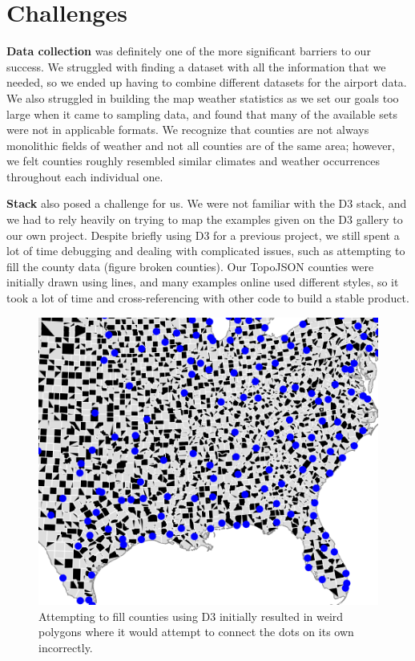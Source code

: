 \documentclass[10pt,twocolumn,twoside]{opticajnl}
\begin{document}
\section {Challenges}

\textbf{Data collection} was definitely one of the more significant barriers to our success. We struggled with finding a dataset with all the information that we needed, so we ended up having to combine different datasets for the airport data. We also struggled in building the map weather statistics as we set our goals too large when it came to sampling data, and found that many of the available sets were not in applicable formats. We recognize that counties are not always monolithic fields of weather and not all counties are of the same area; however, we felt counties roughly resembled similar climates and weather occurrences throughout each individual one. 

\textbf{Stack} also posed a challenge for us. We were not familiar with the D3 stack, and we had to rely heavily on trying to map the examples given on the D3 gallery \cite{d3_2020_gallery} to our own project. Despite briefly using D3 for a previous project, we still spent a lot of time debugging and dealing with complicated issues, such as attempting to fill the county data (figure broken counties). Our TopoJSON counties were initially drawn using lines, and many examples online used different styles, so it took a lot of time and cross-referencing with other code to build a stable product.

\begin{figure}
	\centering
	\includegraphics[scale=0.5]{images/countiesBroken.png}
	\caption{Attempting to fill counties using D3 initially resulted in weird polygons where it would attempt to connect the dots on its own incorrectly.}
\end{figure}
\end{document}
